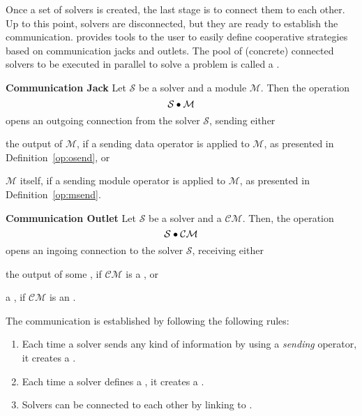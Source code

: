 Once a set of solvers is created, the last stage is to connect them to each other. Up to this point, solvers are disconnected, but they are ready to establish the communication. \posl{} provides tools  to the user to easily define cooperative strategies based on communication jacks and outlets. The pool of (concrete) connected solvers to be executed in parallel to solve a problem is called a \INTROsoset{}. 


\begin{definition}\label{def:comm_jack}
{\bf Communication Jack} Let $\mathcal{S}$ be a solver and a module $\mathcal{M}$. Then the operation $$\mathcal{S}\bullet\mathcal{M}$$ opens an outgoing connection from the solver $\mathcal{S}$, sending either 
\begin{inparaenum}[a)]
	\item the output of $\mathcal{M}$, if a sending data operator is applied to $\mathcal{M}$, as presented in Definition~\ref{op:osend}, or
	\item $\mathcal{M}$ itself, if a sending module operator is applied to $\mathcal{M}$, as presented in Definition~\ref{op:msend}.
\end{inparaenum}
\end{definition} 

\begin{definition}\label{def:comm_outlet}
{\bf Communication Outlet} Let $\mathcal{S}$ be a solver and a \opch{} $\mathcal{CM}$. Then, the operation $$\mathcal{S}\bullet\mathcal{CM}$$ opens an ingoing connection to the solver $\mathcal{S}$, receiving either 
\begin{inparaenum}[a)]
	\item the output of some \om{}, if $\mathcal{CM}$ is a \dopch{}, or
	\item a \om{}, if $\mathcal{CM}$ is an \oopch.
\end{inparaenum}
\end{definition} 

\separation

The communication is established by following the following rules: %
\begin{enumerate}%
	\item Each time a solver sends any kind of information by using a {\it sending} operator, it creates a \INTROjack.
	\item Each time a solver defines a \opch, it creates a \INTROoutlet. 
	\item Solvers can be connected to each other by linking \jacks{} to \outlets.
\end{enumerate} %

